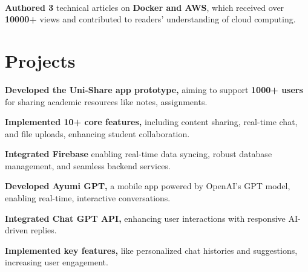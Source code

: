 \documentclass[]{deedy-resume-openfont}
\begin{document}
\vspace{0.4mm}
\hfill {} \\
\vspace{0.7mm}
\hfill {}
\vspace{1.7mm}
\begin{tightemize}
	\item \textbf{Authored 3} technical articles on \textbf{Docker and AWS}, which received over \textbf{10000+} views and contributed to readers' understanding of cloud computing.
\end{tightemize}
\sectionsep


\section{Projects}
\hfill {}
\vspace{1.7mm}
\begin{tightemize}
	\item \textbf{Developed the Uni-Share app prototype,} aiming to support \textbf{1000+ users} for sharing academic resources like notes, assignments.
    \vspace{-1.7mm}
	\item \textbf{Implemented 10+ core features,} including content sharing, real-time chat, and file uploads, enhancing student collaboration.
    \vspace{-1.7mm}
    \item \textbf{Integrated Firebase} enabling real-time data syncing, robust database management, and seamless backend services.
\end{tightemize}
\sectionsep

\vspace{1.4mm}
\hfill {}
\begin{tightemize}
    \item \textbf{Developed Ayumi GPT,} a mobile app powered by OpenAI’s GPT model, enabling real-time, interactive conversations.    
    \vspace{-1.7mm}
    \item \textbf{Integrated Chat GPT API,} enhancing user interactions with responsive AI-driven replies.
    \vspace{-1.7mm}
	\item \textbf{Implemented key features,} like personalized chat histories and suggestions, increasing user engagement.
\end{tightemize}
\sectionsep
\end{document}
